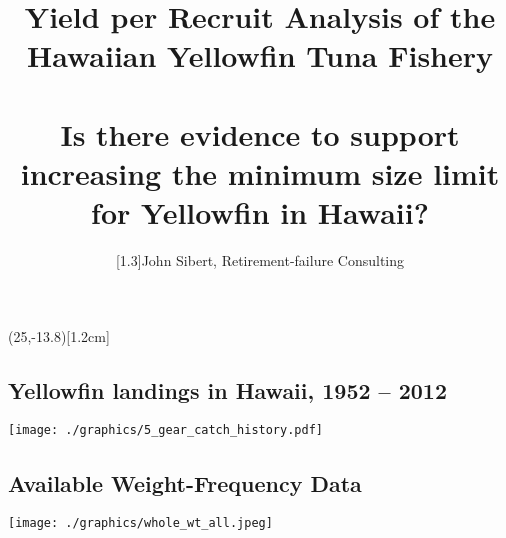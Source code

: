 \documentclass[a4paper,KOMA,landscape,titlepage]{powersem}
\begin{document}
\pageTransitionReplace
\pagecounter[on]


\freelogo(25,-13.8)[1.2cm] %

\author{\scalebox{1}[1.3]{John Sibert, Retirement-failure Consulting}} 
\title{Yield per Recruit Analysis of the Hawaiian
Yellowfin Tuna Fishery\\~\\
{\Large \color{section3}
Is there evidence to support increasing the minimum size limit for
Yellowfin in Hawaii?}}
\address{\href{mailto:sibert@hawaii.edu}{sibert@hawaii.edu}}
\begin{slide}
\maketitle
\end{slide}
\centerslidesfalse

\begin{slide}\section{Yellowfin landings in Hawaii, 1952 -- 2012}
\begin{center}
\texttt{[image: ./graphics/5\_gear\_catch\_history.pdf]}
\end{center}
\end{slide}

\begin{slide}\section{Available Weight-Frequency Data}
\begin{center}
\texttt{[image: ./graphics/whole\_wt\_all.jpeg]}
\end{center}
\end{slide}
\end{document}
